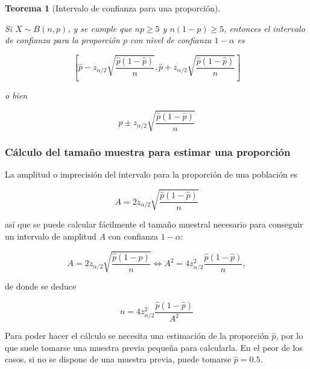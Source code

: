 \documentclass[
  a4paper,
]{scrreport}
\theoremstyle{plain}
\newtheorem{theorem}{Teorema}[chapter]
\theoremstyle{definition}
\theoremstyle{definition}
\theoremstyle{remark}
\begin{document}
\begin{theorem}[Intervalo de confianza para una
proporción]\protect\hypertarget{thm-intervalo-confianza-proporcion}{}\label{thm-intervalo-confianza-proporcion}

Si \(X\sim B(n,p)\), y se cumple que \(np\geq 5\) y \(n(1-p)\geq 5\),
entonces el \emph{intervalo de confianza para la proporción} \(p\) con
nivel de confianza \(1-\alpha\) es

\[
\left[\hat{p}-z_{\alpha/2}\sqrt{\frac{\hat{p}(1-\hat{p})}{n}},\hat{p}+z_{\alpha/2}\sqrt{\frac{\hat{p}(1-\hat{p})}{n}}\right]
\]

o bien

\[
\hat{p}\pm z_{\alpha/2}\sqrt{\frac{\hat{p}(1-\hat{p})}{n}}
\]

\end{theorem}

\hypertarget{cuxe1lculo-del-tamauxf1o-muestra-para-estimar-una-proporciuxf3n}{%
\subsubsection{Cálculo del tamaño muestra para estimar una
proporción}\label{cuxe1lculo-del-tamauxf1o-muestra-para-estimar-una-proporciuxf3n}}

La amplitud o imprecisión del intervalo para la proporción de una
población es

\[
A= 2 z_{\alpha/2}\sqrt{\frac{\hat{p}(1-\hat{p})}{n}}
\]

así que se puede calcular fácilmente el tamaño muestral necesario para
conseguir un intervalo de amplitud \(A\) con confianza \(1-\alpha\):

\[
A= 2 z_{\alpha/2}\sqrt{\frac{\hat{p}(1-\hat{p})}{n}} \Leftrightarrow A^2= 4 z_{\alpha/2}^2\frac{\hat{p}(1-\hat{p})}{n},
\]

de donde se deduce

\[
{n= 4 z_{\alpha/2}^2\frac{\hat{p}(1-\hat{p})}{A^2}}
\]

Para poder hacer el cálculo se necesita una estimación de la proporción
\(\hat{p}\), por lo que suele tomarse una muestra previa pequeña para
calcularla. En el peor de los casos, si no se dispone de una muestra
previa, puede tomarse \(\hat{p}=0.5\).
\end{document}
